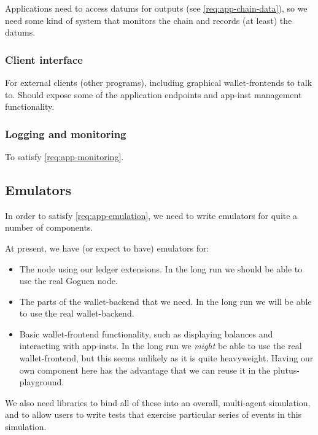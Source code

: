 \subsubsection{}

Applications need to access \glspl{datum} for outputs (see \cref{req:app-chain-data}), so we need some kind of system that monitors the chain and records (at least) the \glspl{datum}.

\subsubsection{Client interface}

For external clients (other programs), including graphical \glspl{wallet-frontend} to talk to.
Should expose some of the application endpoints and \gls{app-inst} management functionality.

\subsubsection{Logging and monitoring}

To satisfy \cref{req:app-monitoring}.

\subsection{Emulators}

In order to satisfy \cref{req:app-emulation}, we need to write emulators for quite a number of components.

At present, we have (or expect to have) emulators for:
\begin{itemize}
\item
  The \gls{node} using our ledger extensions.
  In the long run we should be able to use the real Goguen \gls{node}.
\item
  The parts of the \gls{wallet-backend} that we need.
  In the long run we will be able to use the real \gls{wallet-backend}.
\item
  Basic \gls{wallet-frontend} functionality, such as displaying balances and interacting with \glspl{app-inst}.
  In the long run we \emph{might} be able to use the real \gls{wallet-frontend}, but this seems unlikely as it is quite heavyweight.
  Having our own component here has the advantage that we can reuse it in the \gls{plutus-playground}.
\end{itemize}

We also need libraries to bind all of these into an overall, multi-agent simulation, and to allow users to write tests that exercise particular series of events in this simulation.

